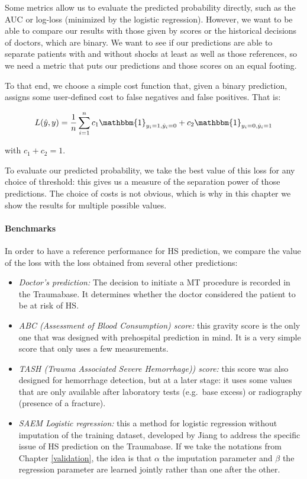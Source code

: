 Some metrics allow us to evaluate the predicted probability directly, such as the AUC \cite{huang2005AUC} or log-loss (minimized by the logistic regression). However, we want to be able to compare our results with those given by scores or the historical decisions of doctors, which are binary. We want to see if our predictions are able to separate patients with and without shocks at least as well as those references, so we need a metric that puts our predictions and those scores on an equal footing.

To that end, we choose a simple cost function that, given a binary prediction, assigns some user-defined cost to false negatives and false positives. That is:

$$ L(\hat{y}, y)=\frac{1}{n} \sum \limits_{i=1}^n c_1 \mathbbm{1}_{y_i=1,\hat{y}_i=0} + c_2 \mathbbm{1}_{y_i=0,\hat{y}_i=1}$$

with $c_1 + c_2 = 1$.

To evaluate our predicted probability, we take the best value of this loss for any choice of threshold: this gives us a measure of the separation power of those predictions. The choice of costs is not obvious, which is why in this chapter we show the results for multiple possible values.

\paragraph{Benchmarks}
In order to have a reference performance for HS prediction, we compare the value of the loss with the loss obtained from several other predictions:
\begin{itemize}
\item \emph{Doctor's prediction:} The decision to initiate a MT procedure is recorded in the Traumabase. It determines whether the doctor considered the patient to be at risk of HS.
\item \emph{ABC (Assessment of Blood Consumption)\cite{nunez2009ABC} score:} this gravity score is the only one that was designed with prehospital prediction in mind. It is a very simple score that only uses a few measurements.
\item \emph{TASH (Trauma Associated Severe Hemorrhage)\cite{yucel2006tash}) score:} this score was also designed for hemorrhage detection, but at a later stage: it uses some values that are only available after laboratory tests (e.g.\ base excess) or radiography (presence of a fracture).
\item \emph{SAEM Logistic regression:} this a method for logistic regression without imputation of the training dataset, developed by Jiang \cite{jiangsaem} to address the specific issue of HS prediction on the Traumabase. If we take the notations from Chapter \ref{validation}, the idea is that $\alpha$ the imputation parameter and $\beta$ the regression parameter are learned jointly rather than one after the other. 
\end{itemize}


